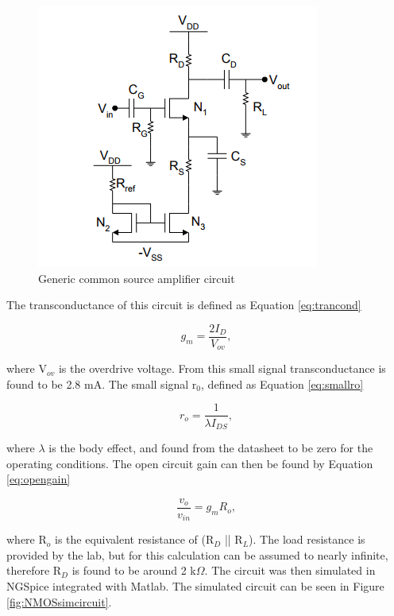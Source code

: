 	
	\begin{figure}[H]
		\centering
		\includegraphics[width=.55\textwidth]{CircuitDevelopment/genericschem.png}
		\caption{Generic common source amplifier circuit \cite{b1}}
		\label{fig:currentgeneric}
	\end{figure}
	
	The transconductance of this circuit is defined as Equation \ref{eq:trancond}
	
	\begin{equation}\label{eq:trancond}
	g_m = \frac{2I_D}{V_{ov}},
	\end{equation}
	
	where V$_{ov}$ is the overdrive voltage. From this small signal transconductance is found to be 2.8 mA. The small signal r$_0$, defined as Equation \ref{eq:smallro}
	
	\begin{equation}\label{eq:smallro}
	
	r_o = \frac{1}{\lambda I_{DS}},
	
	\end{equation}
	
	where $\lambda$ is the body effect, and found from the datasheet \cite{NMOS} to be zero for the operating conditions. The open circuit gain can then be found by Equation \ref{eq:opengain} 
	
	\begin{equation}\label{eq:opengain}
	\frac{v_o}{v_{in}} = g_mR_o,
	\end{equation}
	
	where R$_o$ is the equivalent resistance of (R$_D$ || R$_L$). The load resistance is provided by the lab, but for this calculation can be assumed to nearly infinite, therefore R$_D$ is found to be around 2 k$\Omega$. The circuit was then simulated in NGSpice integrated with Matlab. The simulated circuit can be seen in Figure \ref{fig:NMOSsimcircuit}.
	
